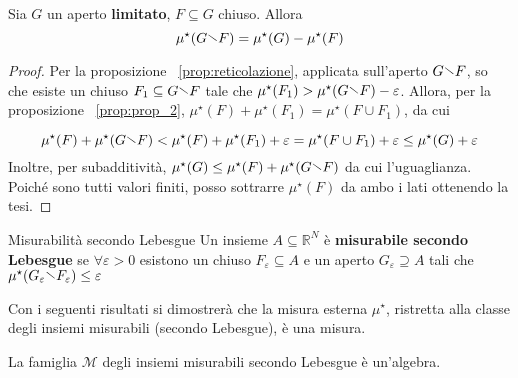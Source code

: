 \begin{proposition}\label{prop:prop_4}
Sia \(G\) un aperto \textbf{limitato}, \(F \subseteq G \) chiuso. Allora 
\[\mu^\star(G \sminus F) = \mu^\star(G) - \mu^\star(F)\]
\end{proposition}
\begin{proof}

Per la proposizione
~\ref{prop:reticolazione}, 
applicata sull'aperto \(G \sminus F\), so che esiste un
chiuso \(F_{1} \subseteq G \sminus F \) tale che \(\mu^\star(F_{1}) >
\mu^\star(G \sminus F) - \varepsilon\). Allora, per la proposizione
~\ref{prop:prop_2},
\(\mu^\star(F) + \mu^\star(F_{1})
= \mu^\star(F \cup F_{1})\), da cui

\[
    \mu^\star(F) + \mu^\star(G\sminus F) < \mu^\star(F) + \mu^\star(F_{1}) +
    \varepsilon = \mu^\star(F \cup F_{1}) + \varepsilon \le \mu^\star(G) + \varepsilon
\]
Inoltre, per subadditività, \(\mu^\star(G) \le \mu^\star(F) + \mu^\star(G\sminus F)\) da cui
l'uguaglianza. Poiché sono tutti valori finiti, posso sottrarre \(\mu^\star(F)\)
da ambo i lati ottenendo la tesi.
\end{proof}
\begin{definition}{Misurabilità secondo Lebesgue}
    Un insieme \(A \subseteq \mathbb{R}^{N} \) è \textbf{misurabile secondo
    Lebesgue} se \(\forall \varepsilon > 0\) esistono un chiuso \(F_\varepsilon
    \subseteq A \) e un aperto \(G_\varepsilon \supseteq A \) tali che
    \(\mu^\star(G_\varepsilon \sminus F_\varepsilon) \le \varepsilon\) 
\end{definition}
\begin{remark}
    Con i seguenti risultati si dimostrerà che la misura esterna \(\mu^\star\),
    ristretta alla classe degli insiemi misurabili (secondo Lebesgue), è una
    misura.
\end{remark}
\begin{theorem}
    La famiglia \(\mathcal{M}\) degli insiemi misurabili secondo Lebesgue è
    un'algebra.
\end{theorem}
